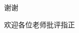 \documentclass{beamer}
\begin{document}















\begin{frame}[standout]
  谢谢

  欢迎各位老师批评指正
\end{frame}

\end{document}
